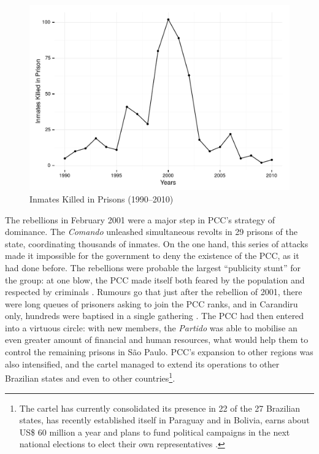\begin{center}
\begin{figure}[bth!]
\includegraphics[height = 8cm, width = 1\linewidth]{gfx/fig5}
\caption[Inmates Killed in Prisons (1990--2010)]{Inmates Killed in Prisons (1990--2010)\footnotemark}
\label{fig:fig5}
\end{figure}
\end{center}

The rebellions in February 2001 were a major step in PCC's strategy of dominance. The \textit{Comando} unleashed simultaneous revolts in 29 prisons of the state, coordinating thousands of inmates. On the one hand, this series of attacks made it impossible for the government to deny the existence of the PCC, as it had done before. The rebellions were probable the largest ``publicity stunt'' for the group: at one blow, the PCC made itself both feared by the population and respected by criminals \citep[]{demedo2007}. Rumours go that just after the rebellion of 2001, there were long queues of prisoners asking to join the PCC ranks, and in Carandiru only, hundreds were baptised in a single gathering \citep[401]{dias2013organized}. The PCC had then entered into a virtuous circle: with new members, the \textit{Partido} was able to mobilise an even greater amount of financial and human resources, what would help them to control the remaining prisons in S\~{a}o Paulo. PCC's expansion to other regions was also intensified, and the cartel managed to extend its operations to other Brazilian states and even to other countries\footnote{The cartel has currently consolidated its presence in 22 of the 27 Brazilian states, has recently established itself in Paraguay and in Bolivia, earns about US\$ 60 million a year and plans to fund political campaigns in the next national elections to elect their own representatives \citep[apud][]{veja2013}.}. 

